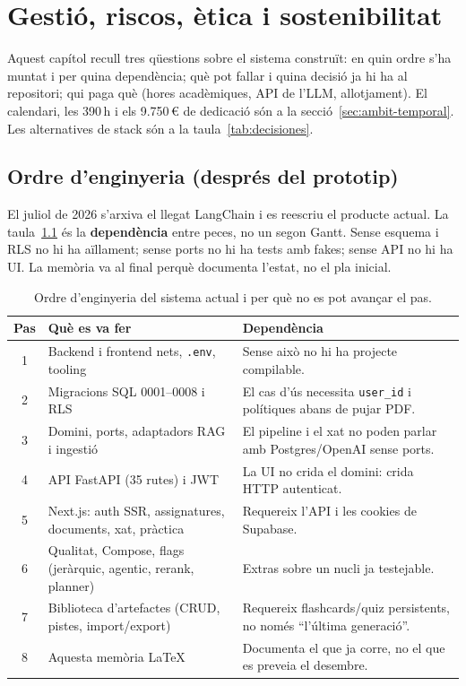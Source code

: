 \chapter{Gestió, riscos, ètica i sostenibilitat}
\label{cap:gestion}

Aquest capítol recull tres qüestions sobre el sistema construït: en quin ordre s'ha muntat i per quina dependència; què pot fallar i quina decisió ja hi ha al repositori; qui paga què (hores acadèmiques, API de l'LLM, allotjament). El calendari, les 390\,h i els 9.750\,€ de dedicació són a la secció~\ref{sec:ambit-temporal}. Les alternatives de stack són a la taula~\ref{tab:decisiones}.

\section{Ordre d'enginyeria (després del prototip)}

El juliol de 2026 s'arxiva el llegat LangChain i es reescriu el producte actual. La taula~\ref{tab:ordre-eng} és la \textbf{dependència} entre peces, no un segon Gantt. Sense esquema i RLS no hi ha aïllament; sense ports no hi ha tests amb fakes; sense API no hi ha UI. La memòria va al final perquè documenta l'estat, no el pla inicial.

\begin{table}[htbp]
\centering
\caption{Ordre d'enginyeria del sistema actual i per què no es pot avançar el pas.}
\label{tab:ordre-eng}
\small
\begin{tabularx}{\textwidth}{c>{\raggedright\arraybackslash}p{3.4cm}X}
\toprule
Pas & Què es va fer & Dependència \\
\midrule
1 & Backend i frontend nets, \texttt{.env}, tooling & Sense això no hi ha projecte compilable. \\
2 & Migracions SQL 0001--0008 i RLS & El cas d'ús necessita \texttt{user\_id} i polítiques abans de pujar PDF. \\
3 & Domini, ports, adaptadors RAG i ingestió & El pipeline i el xat no poden parlar amb Postgres/OpenAI sense ports. \\
4 & API FastAPI (35 rutes) i JWT & La UI no crida el domini: crida HTTP autenticat. \\
5 & Next.js: auth SSR, assignatures, documents, xat, pràctica & Requereix l'API i les cookies de Supabase. \\
6 & Qualitat, Compose, flags (jeràrquic, agentic, rerank, planner) & Extras sobre un nucli ja testejable. \\
7 & Biblioteca d'artefactes (CRUD, pistes, import/export) & Requereix flashcards/quiz persistents, no només ``l'última generació''. \\
8 & Aquesta memòria \LaTeX{} & Documenta el que ja corre, no el que es preveia el desembre. \\
\bottomrule
\end{tabularx}
\end{table}

